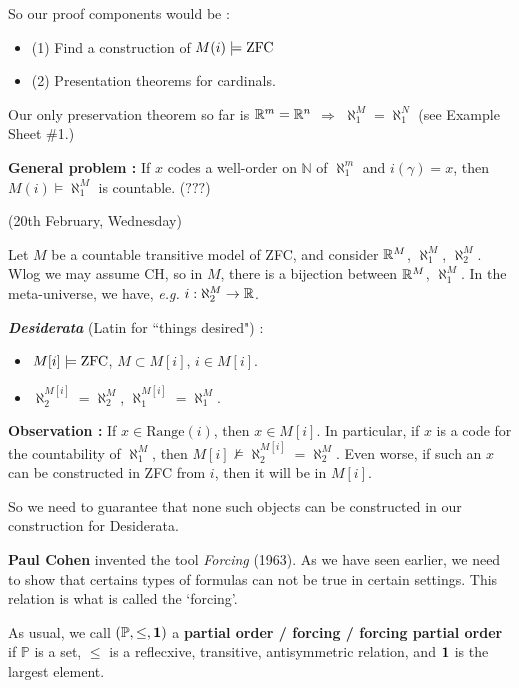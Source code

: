 \documentclass[12pt,a4paper]{article}
\renewenvironment{i}
{\begin{itemize} 
	}%
	{\end{itemize}
}
\begin{document}
\quad So our proof components would be :
\begin{i}
\item[(1)] Find a construction of $M(i) \models \text{ZFC}$
\item[(2)] Presentation theorems for cardinals.
\end{i}
Our only preservation theorem so far is $\mathbb{R}^m = \mathbb{R}^n$ $\Rightarrow$ $\aleph_1^M = \aleph_1^N$ (see Example Sheet \#1.)
\s

\textbf{General problem :} If $x$ codes a well-order on $\mathbb{N}$ of $\aleph_1^m$ and $i(\gamma) = x$, then $M(i) \models \aleph_1^M$ is countable. ($???$)


\newday

(20th February, Wednesday)
\s

Let $M$ be a countable transitive model of ZFC, and consider $\mathbb{R}^M$, $\aleph^M_1$, $\aleph^M_2$.  Wlog we may assume CH, so in $M$, there is a bijection between $\mathbb{R}^M$, $\aleph^M_1$. In the meta-universe, we have, \textit{e.g.} $i: \aleph_2^M \rightarrow \mathbb{R}$.
\s

\textbf{\textit{Desiderata} } (Latin for ``things desired") : 
\begin{i}
\item $M[i] \models \text{ZFC}$, $M\subset M[i]$, $i\in M[i]$.
\item $\aleph^{M[i]}_2 = \aleph_2^M$, $\aleph_1^{M[i]} = \aleph_1^M$.
\end{i}
\s

\textbf{Observation :} If $x\in \text{Range}(i)$, then $x\in M[i]$. In particular, if $x$ is a code for the countability of $\aleph_1^M$, then $M[i] \not\models \aleph_2^{M[i]} = \aleph_2^M$. Even worse, if such an $x$ can be constructed in ZFC from $i$, then it will be in $M[i]$.
\s

So we need to guarantee that none such objects can be constructed in our construction for Desiderata.
\s

\textbf{Paul Cohen} invented the tool \emph{Forcing} (1963). As we have seen earlier, we need to show that certains types of formulas can not be true in certain settings. This relation is what is called the `forcing'. 
\s

 As usual, we call $(\mathbb{P}, \leq, \bm{1})$ a \textbf{partial order / forcing / forcing partial order} if $\mathbb{P}$ is a set, $\leq$ is a reflecxive, transitive, antisymmetric relation, and $\bm{1}$ is the largest element.
\end{document}
